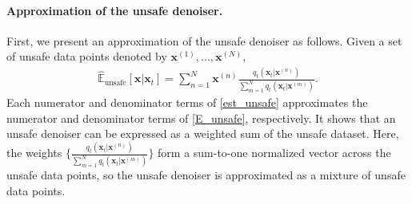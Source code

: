 \paragraph{Approximation of the unsafe denoiser.}
First, we present an approximation of the unsafe denoiser as follows.
%
Given a set of unsafe data points denoted by $\mathbf{x}^{(1)},...,\mathbf{x}^{(N)}$,
\begin{align}\label{eq:est_unsafe}
    \hat{\mathbb{E}}_{\text{unsafe}}[\mathbf{x}\vert\mathbf{x}_{t}]
    =
\sum_{n=1}^{N}\mathbf{x}^{(n)}\frac{q_{t}(\mathbf{x}_{t}\vert\mathbf{x}^{(n)})}{\sum_{m=1}^{N}q_{t}(\mathbf{x}_{t}\vert\mathbf{x}^{(m)})}.
\end{align}
%
%
Each numerator and denominator terms of \eqref{est_unsafe} approximates the numerator and denominator terms of \eqref{E_unsafe}, respectively. It shows that an unsafe denoiser can be expressed as a weighted sum of the unsafe dataset. Here, the weights $\{\frac{q_{t}(\mathbf{x}_{t}\vert\mathbf{x}^{(n)})}{\sum_{m=1}^{N}q_{t}(\mathbf{x}_{t}\vert\mathbf{x}^{(m)})}\}$ form a sum-to-one normalized vector across the unsafe data points, so the unsafe denoiser is approximated as a mixture of unsafe data points.

%

%
%



%

%

%
%
%
%
%
%
%

%


%

%
%
%
%
%
%
%
%
%
%
%
%
%
%
%
%
%

%
%
%
%
%
%



%

%

%

%
%

%

%

%


%
%
%
%
%
%
%
%
%
%
%
%


